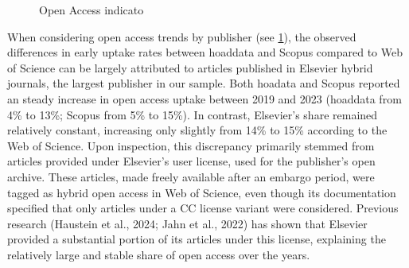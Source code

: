 \documentclass[a4paper,man,floatsintext,longtable,noextraspace,10pt]{apa6}
\begin{document}
\begin{figure}[ht!]


\caption{\label{fig-uptake_publisher}Open Access indicato}

\end{figure}%

When considering open access trends by publisher (see
\ref{fig-uptake_publisher}), the observed differences in early uptake
rates between hoaddata and Scopus compared to Web of Science can be
largely attributed to articles published in Elsevier hybrid journals,
the largest publisher in our sample. Both hoadata and Scopus reported an
steady increase in open access uptake between 2019 and 2023 (hoaddata
from 4\% to 13\%; Scopus from 5\% to 15\%). In contrast, Elsevier's
share remained relatively constant, increasing only slightly from 14\%
to 15\% according to the Web of Science. Upon inspection, this
discrepancy primarily stemmed from articles provided under Elsevier's
user license, used for the publisher's open archive. These articles,
made freely available after an embargo period, were tagged as hybrid
open access in Web of Science, even though its documentation specified
that only articles under a CC license variant were considered. Previous
research (Haustein et al., 2024; Jahn et al., 2022) has shown that
Elsevier provided a substantial portion of its articles under this
license, explaining the relatively large and stable share of open access
over the years.
\end{document}
